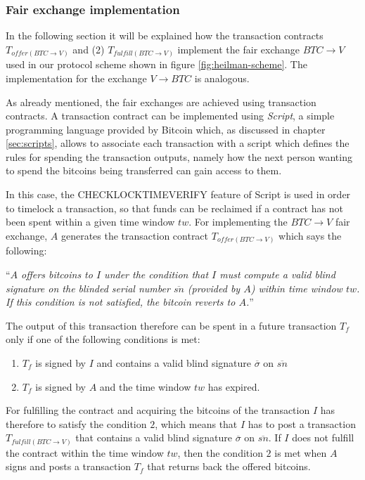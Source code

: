 \subsubsection{Fair exchange implementation} In the following section it will be
explained how the transaction contracts $T_{offer(BTC\rightarrow V)}$ and (2)
$T_{fulfill(BTC\rightarrow V)}$ implement the fair exchange $BTC\rightarrow V$
used in our protocol scheme shown in figure \ref{fig:heilman-scheme}. The
implementation for the exchange $V\rightarrow BTC$ is analogous.

As already mentioned, the fair exchanges are achieved using transaction
contracts. A transaction contract can be implemented using \emph{Script}, a
simple programming language provided by Bitcoin which, as discussed in chapter
\ref{sec:scripts}, allows to associate each transaction with a script which
defines the rules for spending the transaction outputs, namely how the next
person wanting to spend the bitcoins being transferred can gain access to them.

In this case, the CHECKLOCKTIMEVERIFY feature of Script is used in order to
timelock a transaction, so that funds can be reclaimed if a contract has not
been spent within a given time window $tw$. For implementing the $BTC\rightarrow
V$ fair exchange, $A$ generates the transaction contract
$T_{offer(BTC\rightarrow V)}$ which says the following:

``\emph{$A$ offers bitcoins to $I$ under the condition that $I$ must compute a
valid blind signature on the blinded serial number $\overline{sn}$ (provided by $A$)
within time window $tw$. If this condition is not satisfied, the
bitcoin reverts to $A$.}''

The output of this transaction therefore can be spent in a future transaction $T_f$
only if one of the following conditions is met:
\begin{enumerate}
  \item $T_f$ is signed by $I$ and contains a valid blind signature $\overline\sigma$ on $\overline{sn}$
  \item $T_f$ is signed by $A$ and the time window $tw$ has expired.
\end{enumerate}
For fulfilling the contract and acquiring the bitcoins of the transaction $I$
has therefore to satisfy the condition $2$, which means that $I$ has to post a
transaction $T_{fulfill(BTC\rightarrow V)}$ that contains a valid blind
signature $\overline\sigma$ on $\overline{sn}$. If $I$ does not fulfill the
contract within the time window $tw$, then the condition $2$ is met when $A$
signs and posts a transaction $T_f$ that returns back the offered bitcoins.

